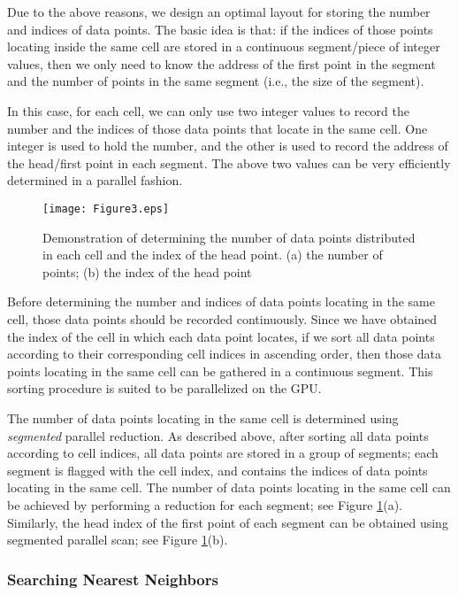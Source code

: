 \documentclass[final,5p,times,twocolumn,authoryear]{elsarticle}
\begin{document}
			Due to the above reasons, we design an optimal layout for storing the number 
			and indices of data points. The basic idea is that: if the indices of those 
			points locating inside the same cell are stored in a continuous 
			segment/piece of integer values, then we only need to know the address of 
			the first point in the segment and the number of points in the same segment 
			(i.e., the size of the segment).
			
			In this case, for each cell, we can only use two integer values to record 
			the number and the indices of those data points that locate in the same 
			cell. One integer is used to hold the number, and the other is used to 
			record the address of the head/first point in each segment. The above two 
			values can be very efficiently determined in a parallel fashion.
			
			\begin{figure}[ht]
				\centering
				\texttt{[image: Figure3.eps]}
				\caption{Demonstration of determining the number of data points 
							distributed in each cell and the index of the head point. (a) the number of 
							points; (b) the index of the head point}
				\label{fig3}
			\end{figure}
			
			
			Before determining the number and indices of data points locating in the 
			same cell, those data points should be recorded continuously. Since we have 
			obtained the index of the cell in which each data point locates, if we sort 
			all data points according to their corresponding cell indices in ascending 
			order, then those data points locating in the same cell can be gathered in a 
			continuous segment. This sorting procedure is suited to be parallelized on 
			the GPU.
			
			The number of data points locating in the same cell is determined using 
			\textit{segmented} parallel reduction. As described above, after sorting all data points 
			according to cell indices, all data points are stored in a group of 
			segments; each segment is flagged with the cell index, and contains the 
			indices of data points locating in the same cell. The number of data points 
			locating in the same cell can be achieved by performing a reduction for each 
			segment; see Figure \ref{fig3}(a). Similarly, the head index of the first point of 
			each segment can be obtained using segmented parallel scan; see Figure \ref{fig3}(b).
			
			\subsubsection{Searching Nearest Neighbors}
			
\end{document}
